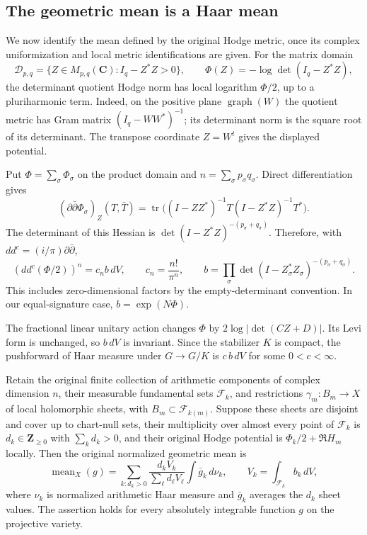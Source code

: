 \subsection{The geometric mean is a Haar mean}
\label{sec:curvature-haar-mean}

We now identify the mean defined by the original Hodge metric, once
its complex uniformization and local metric identifications are given.
For the matrix domain
\[
 \mathcal D_{p,q}=\{Z\in M_{p,q}(\mathbf C):I_q-Z^*Z>0\},
 \qquad \Phi(Z)=-\log\det(I_q-Z^*Z),
\]
the determinant quotient Hodge norm has local logarithm $\Phi/2$,
up to a pluriharmonic term. Indeed, on the positive plane
$\operatorname{graph}(W)$ the quotient metric has Gram matrix
$(I_q-WW^*)^{-1}$; its determinant norm is the square root of
its determinant. The transpose coordinate $Z=W^t$ gives the
displayed potential.

Put $\Phi=\sum_\sigma\Phi_\sigma$ on the product domain and
$n=\sum_\sigma p_\sigma q_\sigma$. Direct differentiation gives
\[
 (\partial\bar\partial\Phi_\sigma)_Z(T,\bar T)
 =\operatorname{tr}\bigl((I-ZZ^*)^{-1}
                       T(I-Z^*Z)^{-1}T^*\bigr).
\]
The determinant of this Hessian is
$\det(I-Z^*Z)^{-(p_\sigma+q_\sigma)}$. Therefore, with
$dd^c=(i/\pi)\partial\bar\partial$,
\[
 (dd^c(\Phi/2))^n=c_n b\,dV,\qquad
 c_n=\frac{n!}{\pi^n},\qquad
 b=\prod_\sigma\det(I-Z_\sigma^*Z_\sigma)^{-(p_\sigma+q_\sigma)}.
\]
This includes zero-dimensional factors by the empty-determinant
convention. In our equal-signature case, $b=\exp(N\Phi)$.

The fractional linear unitary action changes $\Phi$ by
$2\log|\det(CZ+D)|$. Its Levi form is unchanged, so $b\,dV$
is invariant. Since the stabilizer $K$ is compact, the pushforward
of Haar measure under $G\to G/K$ is $c\,b\,dV$ for some
$0<c<\infty$.

\begin{proposition}\label{prop:geometric-haar-mean}
Retain the original finite collection of arithmetic components of
complex dimension $n$, their measurable fundamental sets $\mathcal F_k$,
and restrictions $\gamma_m:B_m\to X$ of local holomorphic sheets, with
$B_m\subset\mathcal F_{k(m)}$. Suppose these sheets are disjoint
and cover up to chart-null sets, their multiplicity over almost
every point of $\mathcal F_k$ is $d_k\in\mathbf Z_{\ge0}$ with
$\sum_k d_k>0$, and their original Hodge
potential is $\Phi_k/2+\Re H_m$ locally. Then the original
normalized geometric mean is
\[
 \operatorname{mean}_X(g)=
 \sum_{k:d_k>0}\frac{d_kV_k}{\sum_\ell d_\ell V_\ell}
                 \int\bar g_k\,d\nu_k,\qquad
 V_k=\int_{\mathcal F_k}b_k\,dV,
\]
where $\nu_k$ is normalized arithmetic Haar measure and
$\bar g_k$ averages the $d_k$ sheet values. The assertion holds
for every absolutely integrable function $g$ on the projective variety.
\end{proposition}


